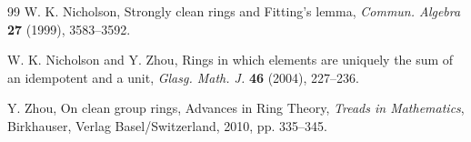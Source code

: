 \documentclass[12pt]{amsart}
\theoremstyle{definition}
\begin{document}
\begin{thebibliography}{99}
W. K. Nicholson, Strongly clean rings and Fitting's lemma, \textit{Commun. Algebra} {\bf 27} (1999), 3583--3592.

W. K. Nicholson and Y. Zhou, Rings in which elements are uniquely the sum of an idempotent and a unit, \textit{Glasg. Math. J.} {\bf 46} (2004), 227--236.

Y. Zhou, On clean group rings, Advances in Ring Theory, \textit{Treads in Mathematics}, Birkhauser, Verlag Basel/Switzerland, 2010, pp. 335--345.

\end{thebibliography}
\end{document}
